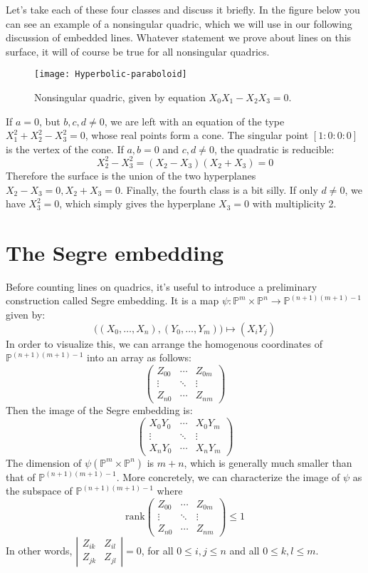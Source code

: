 \documentclass[12 pt]{article}
\newcommand{\Proj}{\mathbb{P}}
\begin{document}
Let's take each of these four classes and discuss it briefly. In the figure below you can see an example of a nonsingular quadric, which we will use 
in our following discussion of embedded lines. Whatever statement we prove about lines on this surface, it will of course be true for all 
nonsingular quadrics.
\begin{figure}[h!]
  \caption{Nonsingular quadric, given by equation $X_0X_1 - X_2X_3 =0$.}
  \centering
    \texttt{[image: Hyperbolic-paraboloid]}
\end{figure}

If $a=0$, but $b,c,d \neq 0$, we are left with an equation of the type $X_1^2+ X_2^2 - X_3^2 = 0$, whose real points form a cone. The singular point
$[1:0:0:0]$ is the vertex of the cone. If $a, b =0$ and $c,d \neq 0$, the quadratic is reducible:
\[ X_2^2 - X_3^2 = (X_2 - X_3)(X_2 + X_3) = 0 \]
Therefore the surface is the union of the two hyperplanes $X_2 - X_3 = 0, X_2 + X_3 = 0$. Finally, the fourth class is a bit silly. If only $d\neq 0$, we
have $X_3^2 = 0$, which simply gives the hyperplane $X_3 = 0$ with multiplicity 2.


\section{The Segre embedding}
Before counting lines on quadrics, it's useful to introduce a preliminary construction called Segre embedding. It is a map $\psi : \Proj^m \times
\Proj^n \to \Proj^{(n+1)(m+1) - 1}$ given by:
\[      \big( ( X_0, \dots, X_n) , (Y_0, \dots, Y_m  )\big)  \mapsto (X_i Y_j)    \]
In order to visualize this, we can arrange the homogenous coordinates of $\Proj^{(n+1)(m+1) - 1}$ into an array as follows:
\[  \left(  \begin{array} {ccc} Z_{00} &\cdots & Z_{0m} \\ \vdots & \ddots & \vdots \\ Z_{n0} &\cdots & Z_{nm} \end{array} \right) \]
Then the image of the Segre embedding is:
\[  \left(  \begin{array} {ccc} X_0 Y_0 &\cdots & X_0 Y_m \\ \vdots & \ddots & \vdots \\ X_n Y_0 &\cdots & X_nY_m \end{array} \right) \]
The dimension of $\psi(\Proj^m \times \Proj^n)$ is $m+n$, which is generally much smaller than that of $\Proj^{(n+1)(m+1) - 1}$. More
concretely, we can characterize the image of $\psi$ as the subspace of $\Proj^{(n+1)(m+1) - 1}$ where
\[  \text{rank} \left(  \begin{array} {ccc} Z_{00} &\cdots & Z_{0m} \\ \vdots & \ddots & \vdots \\ Z_{n0} &\cdots & Z_{nm} \end{array} \right)
\leq 1 \]
In other words, $\left|  \begin{array} {cc} Z_{ik} & Z_{il} \\ Z_{jk} & Z_{jl} \end{array} \right| = 0$, for all $0 \leq i,j \leq n$ and all $0\leq k,l\leq m$.
\end{document}
